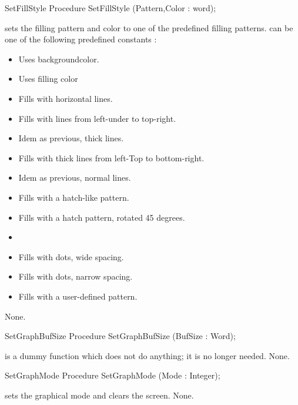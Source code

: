 \begin{procedure}{SetFillStyle}
\Declaration
Procedure SetFillStyle (Pattern,Color : word);

\Description
{} sets the filling pattern and color to one of the
predefined filling patterns.  can be one of the following predefined
constants :

\begin{itemize}
\item {} Uses backgroundcolor.
\item {} Uses filling color
\item {} Fills with horizontal lines.
\item {} Fills with lines from left-under to top-right.
\item {} Idem as previous, thick lines.
\item {} Fills with thick lines from left-Top to bottom-right.
\item {} Idem as previous, normal lines.
\item {}  Fills with a hatch-like pattern.
\item {} Fills with a hatch pattern, rotated 45 degrees.
\item {} 
\item {} Fills with dots, wide spacing.
\item {} Fills with dots, narrow spacing.
\item {} Fills with a user-defined pattern.
\end{itemize}

\Errors
None.
\SeeAlso
{}
\end{procedure}

\begin{procedure}{SetGraphBufSize}
\Declaration
Procedure SetGraphBufSize (BufSize : Word);

\Description
{} is a dummy function which does not do 
anything; it is no longer needed.
\Errors
None.
\SeeAlso

\end{procedure}

\begin{procedure}{SetGraphMode}
\Declaration
Procedure SetGraphMode (Mode : Integer);

\Description
{} sets the graphical mode and clears the screen.
\Errors
None.
\SeeAlso
{}
\end{procedure}

